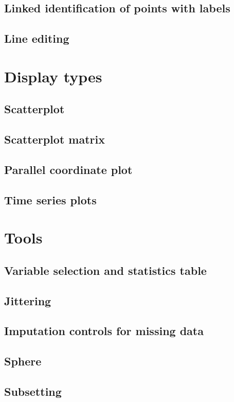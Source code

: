 \documentclass[11pt]{article}
\begin{document}
\subsection{Linked identification of points with labels}
\subsection{Line editing}

\section {Display types}
\subsection{Scatterplot}
\subsection{Scatterplot matrix}
\subsection{Parallel coordinate plot}
\subsection{Time series plots}

\newpage
\section{Tools}
\subsection{Variable selection and statistics table}
\label{slbl:VarStats}
\subsection{Jittering}
\subsection{Imputation controls for missing data}
\subsection{Sphere}
\label{slbl:Sphere}
\subsection{Subsetting}
\end{document}
